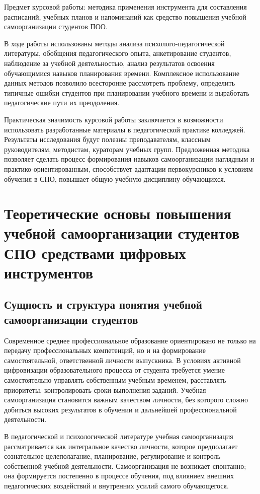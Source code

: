 \documentclass[14pt,a4paper]{article}
\begin{document}
Предмет курсовой работы: методика применения инструмента для составления расписаний, учебных планов и напоминаний как средство повышения учебной самоорганизации студентов ПОО.

В ходе работы использованы методы анализа психолого-педагогической литературы, обобщения педагогического опыта, анкетирование студентов, наблюдение за учебной деятельностью, анализ результатов освоения обучающимися навыков планирования времени. Комплексное использование данных методов позволило всесторонне рассмотреть проблему, определить типичные ошибки студентов при планировании учебного времени и выработать педагогические пути их преодоления.

Практическая значимость курсовой работы заключается в возможности использовать разработанные материалы в педагогической практике колледжей. Результаты исследования будут полезны преподавателям, классным руководителям, методистам, кураторам учебных групп. Предложенная методика позволяет сделать процесс формирования навыков самоорганизации наглядным и практико-ориентированным, способствует адаптации первокурсников к условиям обучения в СПО, повышает общую учебную дисциплину обучающихся.


\newpage
\section{Теоретические основы повышения учебной самоорганизации студентов СПО средствами цифровых инструментов}

\subsection{Сущность и структура понятия учебной самоорганизации студентов}

Современное среднее профессиональное образование ориентировано не только на передачу профессиональных компетенций, но и на формирование самостоятельной, ответственной личности выпускника. В условиях активной цифровизации образовательного процесса от студента требуется умение самостоятельно управлять собственным учебным временем, расставлять приоритеты, контролировать сроки выполнения заданий. Учебная самоорганизация становится важным качеством личности, без которого сложно добиться высоких результатов в обучении и дальнейшей профессиональной деятельности.

В педагогической и психологической литературе учебная самоорганизация рассматривается как интегральное качество личности, которое предполагает сознательное целеполагание, планирование, регулирование и контроль собственной учебной деятельности. Самоорганизация не возникает спонтанно; она формируется постепенно в процессе обучения, под влиянием внешних педагогических воздействий и внутренних усилий самого обучающегося.
\end{document}

